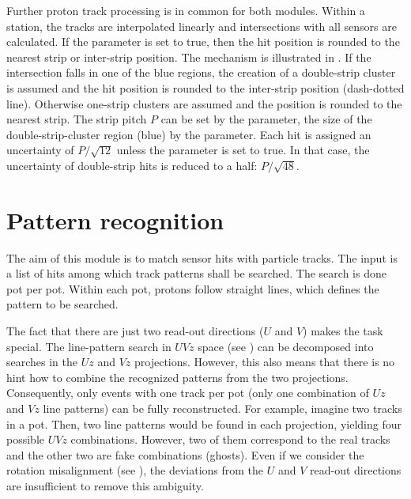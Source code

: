 Further proton track processing is in common for both modules. Within a station, the tracks are interpolated linearly and intersections with all sensors are calculated. If the  parameter is set to true, then the hit position is rounded to the nearest strip or inter-strip position. The mechanism is illustrated in . If the intersection falls in one of the blue regions, the creation of a double-strip cluster is assumed and the hit position is rounded to the inter-strip position (dash-dotted line). Otherwise one-strip clusters are assumed and the position is rounded to the nearest strip. The strip pitch $P$ can be set by the  parameter, the size of the double-strip-cluster region (blue) by the  parameter. Each hit is assigned an uncertainty of $P/\sqrt{12}$ unless the  parameter is set to true. In that case, the uncertainty of double-strip hits is reduced to a half: $P/\sqrt{48}$.



\section[pattern reco]{Pattern recognition}

The aim of this module is to match sensor hits with particle tracks. The input is a list of  hits among which track patterns shall be searched. The search is done pot per pot. Within each pot, protons follow straight lines, which defines the pattern to be searched.

The fact that there are just two read-out directions ($U$ and $V$) makes the task special. The line-pattern search in $UVz$ space (see ) can be decomposed into searches in the $Uz$ and $Vz$ projections. However, this also means that there is no hint how to combine the recognized patterns from the two projections. Consequently, only events with one track per pot (only one combination of $Uz$ and $Vz$ line patterns) can be fully reconstructed. For example, imagine two tracks in a pot. Then, two line patterns would be found in each projection, yielding four possible $UVz$ combinations. However, two of them correspond to the real tracks and the other two are fake combinations (ghosts). Even if we consider the rotation misalignment (see ), the deviations from the $U$ and $V$ read-out directions are insufficient to remove this ambiguity. 

